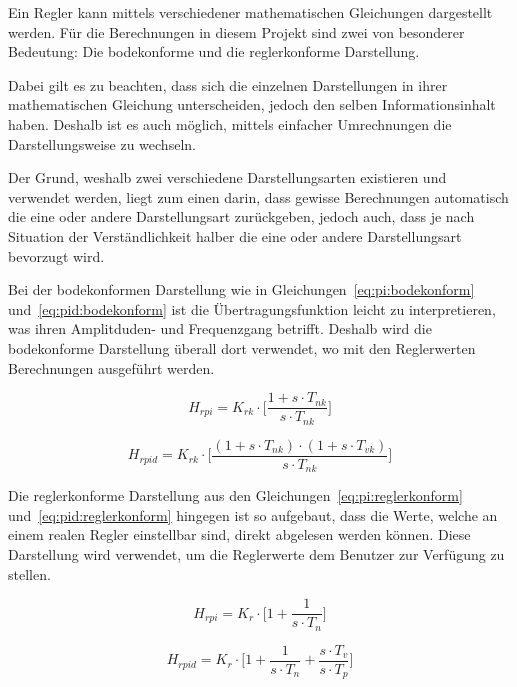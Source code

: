 Ein Regler  kann mittels verschiedener mathematischen  Gleichungen dargestellt
werden.  F\"ur  die Berechnungen  in diesem Projekt  sind zwei  von besonderer
Bedeutung: Die bodekonforme und die reglerkonforme Darstellung.

Dabei gilt  es zu  beachten, dass  sich die  einzelnen Darstellungen  in ihrer
mathematischen Gleichung  unterscheiden, jedoch den  selben Informationsinhalt
haben. Deshalb   ist  es   auch  m\"oglich,  mittels  einfacher   Umrechnungen
die  Darstellungsweise   zu  wechseln.

Der  Grund,   weshalb  zwei  verschiedene  Darstellungsarten   existieren  und
verwendet werden, liegt zum einen darin, dass gewisse Berechnungen automatisch
die eine oder andere Darstellungsart  zur\"uckgeben, jedoch auch, dass je nach
Situation der  Verst\"andlichkeit halber die eine  oder andere Darstellungsart
bevorzugt wird.

Bei der  bodekonformen Darstellung wie  in Gleichungen~\ref{eq:pi:bodekonform}
und~\ref{eq:pid:bodekonform}   ist   die  \"Ubertragungsfunktion   leicht   zu
interpretieren,  was ihren  Amplitduden- und  Frequenzgang betrifft.   Deshalb
wird  die  bodekonforme  Darstellung  \"uberall dort  verwendet,  wo  mit  den
Reglerwerten Berechnungen ausgef\"uhrt werden.

\begin{equation} \label{eq:pi:bodekonform}
    H_{rpi} = K_{rk} \cdot \biggl[ \frac{1 + s \cdot T_{nk}}{s \cdot T_{nk}} \biggr]
\end{equation}

\begin{equation} \label{eq:pid:bodekonform}
    H_{rpid} = K_{rk} \cdot \biggl[ \frac{(1 + s \cdot T_{nk}) \cdot (1 + s \cdot T_{vk}) }{ s \cdot T_{nk} } \biggr]
\end{equation}


Die reglerkonforme  Darstellung aus  den Gleichungen~\ref{eq:pi:reglerkonform}
und~\ref{eq:pid:reglerkonform}  hingegen ist  so  aufgebaut,  dass die  Werte,
welche  an  einem realen  Regler  einstellbar  sind, direkt  abgelesen  werden
k\"onnen. Diese Darstellung  wird verwendet,  um die Reglerwerte  dem Benutzer
zur Verf\"ugung zu stellen.

\begin{equation} \label{eq:pi:reglerkonform}
    H_{rpi} = K_{r} \cdot \biggl[ 1 + \frac{1}{s \cdot T_{n}} \biggr]
\end{equation}

\begin{equation} \label{eq:pid:reglerkonform}
    H_{rpid} = K_{r} \cdot \biggl[ 1 + \frac{1}{s \cdot T_n} + \frac{s \cdot T_v}{s \cdot T_p} \biggr]
\end{equation}

